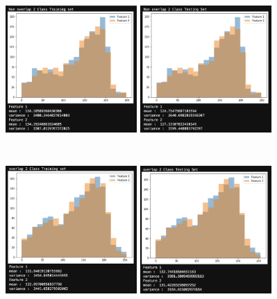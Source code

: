 \documentclass[conference]{IEEEtran}
\begin{document}
\begin{figure}
    \centering
    \includegraphics[width=5cm, height=6cm]{task1.5.png} 
    \includegraphics[width=5cm, height=6cm]{task1.6.png}
    \includegraphics[width=5cm, height=6cm]{task1.7.png}
    \includegraphics[width=5cm, height=6cm]{task1.8.png}
    \label{fig:my_label}
\end{figure}
\end{document}
